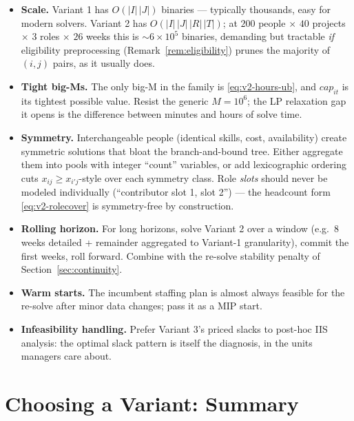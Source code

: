 \documentclass[11pt]{article}
\theoremstyle{remark}
\begin{document}
\begin{itemize}
\item \textbf{Scale.} Variant 1 has $O(|I|\,|J|)$ binaries --- typically
  thousands, easy for modern solvers. Variant 2 has
  $O(|I|\,|J|\,|R|\,|T|)$; at $200$ people $\times$ $40$ projects $\times$
  $3$ roles $\times$ $26$ weeks this is $\sim\!6 \times 10^{5}$ binaries,
  demanding but tractable \emph{if} eligibility preprocessing
  (Remark~\ref{rem:eligibility}) prunes the majority of $(i,j)$ pairs, as
  it usually does.
\item \textbf{Tight big-Ms.} The only big-M in the family is
  \eqref{eq:v2-hours-ub}, and $\mathit{cap}_{it}$ is its tightest possible
  value. Resist the generic $M = 10^{6}$; the LP relaxation gap it opens is
  the difference between minutes and hours of solve time.
\item \textbf{Symmetry.} Interchangeable people (identical skills, cost,
  availability) create symmetric solutions that bloat the branch-and-bound
  tree. Either aggregate them into pools with integer ``count'' variables,
  or add lexicographic ordering cuts $x_{ij} \ge x_{i'j}$-style over each
  symmetry class. Role \emph{slots} should never be modeled individually
  (``contributor slot 1, slot 2'') --- the headcount form
  \eqref{eq:v2-rolecover} is symmetry-free by construction.
\item \textbf{Rolling horizon.} For long horizons, solve Variant 2 over a
  window (e.g.\ 8 weeks detailed + remainder aggregated to Variant-1
  granularity), commit the first weeks, roll forward. Combine with the
  re-solve stability penalty of Section~\ref{sec:continuity}.
\item \textbf{Warm starts.} The incumbent staffing plan is almost always
  feasible for the re-solve after minor data changes; pass it as a MIP
  start.
\item \textbf{Infeasibility handling.} Prefer Variant 3's priced slacks to
  post-hoc IIS analysis: the optimal slack pattern is itself the
  diagnosis, in the units managers care about.
\end{itemize}

\section{Choosing a Variant: Summary}
\end{document}
